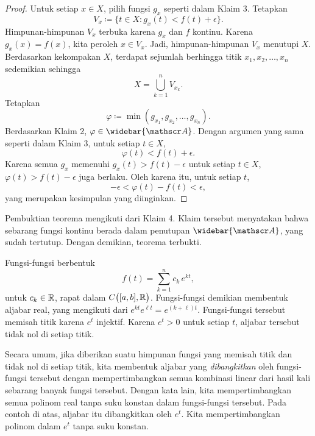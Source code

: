 \begin{proof}
Untuk setiap $x \in X$, pilih fungsi $g_x$ seperti dalam Klaim 3.
Tetapkan
\begin{equation*}
V_x \coloneqq \bigl\{ t \in X : g_x(t) < f(t) + \epsilon \bigr\}.
\end{equation*}
Himpunan-himpunan $V_x$ terbuka karena $g_x$ dan $f$ kontinu.
Karena $g_x(x) = f(x)$, kita peroleh $x \in V_x$. Jadi, himpunan-himpunan
$V_x$ menutupi $X$. Berdasarkan kekompakan $X$, terdapat sejumlah berhingga
titik $x_1,x_2,\ldots,x_n$ sedemikian sehingga
\begin{equation*}
X = \bigcup_{k=1}^n V_{x_k} .
\end{equation*}
Tetapkan
\begin{equation*}
\varphi \coloneqq \min(g_{x_1},g_{x_2},\ldots,g_{x_n}) .
\end{equation*}
Berdasarkan Klaim 2, $\varphi \in \widebar{\sA}$. Dengan argumen yang sama
seperti dalam Klaim 3, untuk setiap $t \in X$,
\begin{equation*}
\varphi(t) < f(t) + \epsilon .
\end{equation*}
Karena semua $g_x$ memenuhi $g_x(t) > f(t) - \epsilon$ untuk setiap $t \in X$,
$\varphi(t) > f(t) - \epsilon$ juga berlaku.
Oleh karena itu, untuk setiap $t$,
\begin{equation*}
-\epsilon < \varphi(t) - f(t) < \epsilon ,
\end{equation*}
yang merupakan kesimpulan yang diinginkan.
\end{proof}

Pembuktian teorema mengikuti dari Klaim 4. Klaim tersebut menyatakan bahwa
sebarang fungsi kontinu berada dalam penutupan $\widebar{\sA}$, yang sudah
tertutup. Dengan demikian, teorema terbukti.

\begin{example}
Fungsi-fungsi berbentuk
\begin{equation*}
f(t) = \sum_{k=1}^n c_k \, e^{kt},
\end{equation*}
untuk $c_k \in {\mathbb{R}}$,
rapat dalam $C\bigl([a,b],{\mathbb{R}}\bigr)$. Fungsi-fungsi demikian membentuk aljabar
real, yang mengikuti dari $e^{kt} e^{\ell t} = e^{(k+\ell)t}$. Fungsi-fungsi
tersebut memisah titik karena $e^t$ injektif.
Karena $e^t > 0$ untuk setiap $t$, aljabar tersebut
tidak nol di setiap titik.
\end{example}

Secara umum, jika diberikan suatu himpunan fungsi yang memisah titik dan tidak
nol di setiap titik, kita membentuk aljabar yang
\emph{dibangkitkan}
oleh fungsi-fungsi tersebut dengan mempertimbangkan semua kombinasi linear
dari hasil kali sebarang banyak fungsi tersebut. Dengan kata lain, kita mempertimbangkan semua
polinom real tanpa suku konstan dalam fungsi-fungsi tersebut. Pada contoh di
atas, aljabar itu dibangkitkan oleh $e^t$. Kita
mempertimbangkan polinom dalam $e^t$ tanpa suku konstan.

